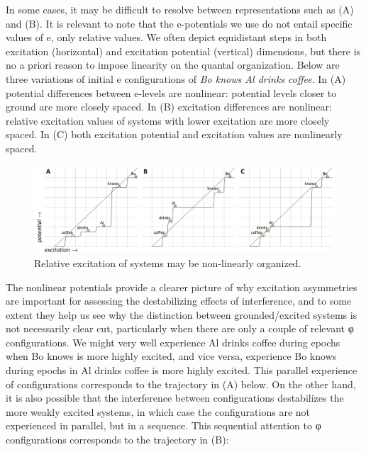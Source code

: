    In some cases, it may be difficult to resolve between representations such as (A) and (B). It is relevant to note that the e-potentials we use do not entail specific values of e, only relative values. We often depict equidistant steps in both excitation (horizontal) and excitation potential (vertical) dimensions, but there is no a priori reason to impose linearity on the quantal organization. Below are three variations of initial e configurations of \textit{Bo knows Al drinks coffee}. In (A) potential differences between e-levels are nonlinear: potential levels closer to ground are more closely spaced. In (B) excitation differences are nonlinear: relative excitation values of systems with lower excitation are more closely spaced. In (C) both excitation potential and excitation values are nonlinearly spaced.

  
\begin{figure}
\includegraphics[width=\textwidth]{figures/Tilsen-img96.png}
\caption{Relative excitation of systems may be non-linearly organized.}
\label{fig:4:46}
\end{figure}
   

  The nonlinear potentials provide a clearer picture of why excitation asymmetries are important for assessing the destabilizing effects of interference, and to some extent they help us see why the distinction between grounded/excited systems is not necessarily clear cut, particularly when there are only a couple of relevant φ configurations. We might very well experience {\textbar}Al drinks coffee{\textbar} during epochs when {\textbar}Bo knows{\textbar} is more highly excited, and vice versa, experience {\textbar}Bo knows{\textbar} during epochs in {\textbar}Al drinks coffee{\textbar} is more highly excited. This parallel experience of configurations corresponds to the trajectory in (A) below. On the other hand, it is also possible that the interference between configurations destabilizes the more weakly excited systems, in which case the configurations are not experienced in parallel, but in a sequence. This sequential attention to φ configurations corresponds to the trajectory in (B):

